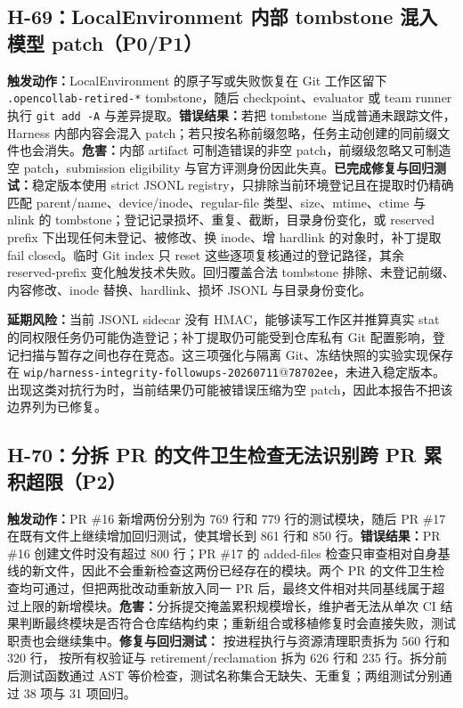 \documentclass[11pt,a4paper,fontset=fandol]{ctexart}
\newcommand{\code}[1]{\texttt{#1}}
\begin{document}
\subsection{H-69：LocalEnvironment 内部 tombstone 混入模型 patch（P0/P1）}

\textbf{触发动作：}LocalEnvironment 的原子写或失败恢复在 Git 工作区留下 \code{.opencollab-retired-*} tombstone，随后 checkpoint、evaluator 或 team runner 执行 \code{git add -A} 与差异提取。\textbf{错误结果：}若把 tombstone 当成普通未跟踪文件，Harness 内部内容会混入 patch；若只按名称前缀忽略，任务主动创建的同前缀文件也会消失。\textbf{危害：}内部 artifact 可制造错误的非空 patch，前缀级忽略又可制造空 patch，submission eligibility 与官方评测身份因此失真。\textbf{已完成修复与回归测试：}稳定版本使用 strict JSONL registry，只排除当前环境登记且在提取时仍精确匹配 parent/name、device/inode、regular-file 类型、size、mtime、ctime 与 nlink 的 tombstone；登记记录损坏、重复、截断，目录身份变化，或 reserved prefix 下出现任何未登记、被修改、换 inode、增 hardlink 的对象时，补丁提取 fail closed。临时 Git index 只 reset 这些逐项复核通过的登记路径，其余 reserved-prefix 变化触发技术失败。回归覆盖合法 tombstone 排除、未登记前缀、内容修改、inode 替换、hardlink、损坏 JSONL 与目录身份变化。

\textbf{延期风险：}当前 JSONL sidecar 没有 HMAC，能够读写工作区并推算真实 stat 的同权限任务仍可能伪造登记；补丁提取仍可能受到仓库私有 Git 配置影响，登记扫描与暂存之间也存在竞态。这三项强化与隔离 Git、冻结快照的实验实现保存在 \code{wip/harness-integrity-followups-20260711}@\code{78702ee}，未进入稳定版本。出现这类对抗行为时，当前结果仍可能被错误压缩为空 patch，因此本报告不把该边界列为已修复。

\subsection{H-70：分拆 PR 的文件卫生检查无法识别跨 PR 累积超限（P2）}

\textbf{触发动作：}PR \#16 新增两份分别为 769 行和 779 行的测试模块，随后 PR \#17 在既有文件上继续增加回归测试，使其增长到 861 行和 850 行。\textbf{错误结果：}PR \#16 创建文件时没有超过 800 行；PR \#17 的 added-files 检查只审查相对自身基线的新文件，因此不会重新检查这两份已经存在的模块。两个 PR 的文件卫生检查均可通过，但把两批改动重新放入同一 PR 后，最终文件相对共同基线属于超过上限的新增模块。\textbf{危害：}分拆提交掩盖累积规模增长，维护者无法从单次 CI 结果判断最终模块是否符合仓库结构约束；重新组合或移植修复时会直接失败，测试职责也会继续集中。\textbf{修复与回归测试：} 按进程执行与资源清理职责拆为 560 行和 320 行， 按所有权验证与 retirement/reclamation 拆为 626 行和 235 行。拆分前后测试函数通过 AST 等价检查，测试名称集合无缺失、无重复；两组测试分别通过 38 项与 31 项回归。
\end{document}

